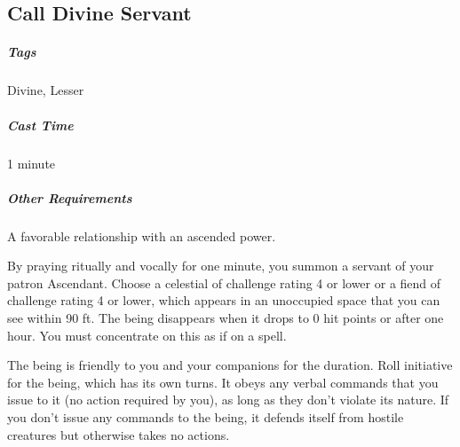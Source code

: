 





\subsection{Call Divine Servant}
\subparagraph*{Tags} Divine, Lesser
\subparagraph*{Cast Time} 1 minute
\subparagraph*{Other Requirements} A favorable relationship with an ascended power.

By praying ritually and vocally for one minute, you summon a servant of your patron Ascendant. Choose a celestial of challenge rating 4 or lower or a fiend of challenge rating 4 or lower, which appears in an unoccupied space that you can see within 90 ft. The being disappears when it drops to 0 hit points or after one hour. You must concentrate on this as if on a spell.

The being is friendly to you and your companions for the duration. Roll initiative for the being, which has its own turns. It obeys any verbal commands that you issue to it (no action required by you), as long as they don’t violate its nature. If you don’t issue any commands to the being, it defends itself from hostile creatures but otherwise takes no actions.

